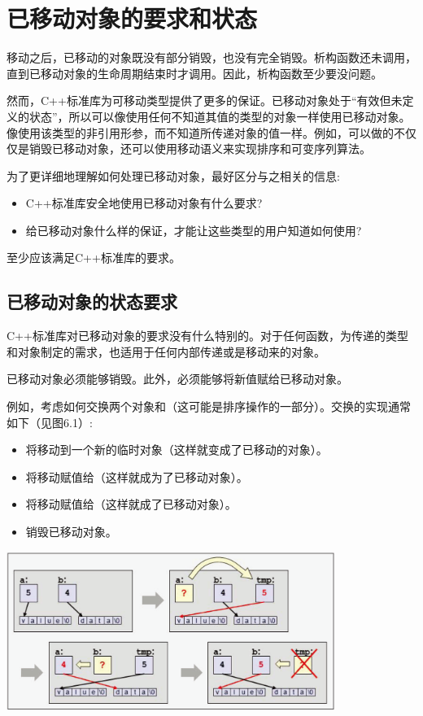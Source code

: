 \section{已移动对象的要求和状态}
移动之后，已移动的对象既没有部分销毁，也没有完全销毁。析构函数还未调用，直到已移动对象的生命周期结束时才调用。因此，析构函数至少要没问题。

然而，C++标准库为可移动类型提供了更多的保证。已移动对象处于“有效但未定义的状态”，所以可以像使用任何不知道其值的类型的对象一样使用已移动对象。像使用该类型的非引用形参，而不知道所传递对象的值一样。例如，可以做的不仅仅是销毁已移动对象，还可以使用移动语义来实现排序和可变序列算法。

为了更详细地理解如何处理已移动对象，最好区分与之相关的信息:

\begin{itemize}
	\item C++标准库安全地使用已移动对象有什么要求?
	\item 给已移动对象什么样的保证，才能让这些类型的用户知道如何使用?
\end{itemize}

至少应该满足C++标准库的要求。

\subsection{已移动对象的状态要求}

C++标准库对已移动对象的要求没有什么特别的。对于任何函数，为传递的类型和对象制定的需求，也适用于任何内部传递或是移动来的对象。

已移动对象必须能够销毁。此外，必须能够将新值赋给已移动对象。

例如，考虑如何交换两个对象和（这可能是排序操作的一部分）。交换的实现通常如下（见图6.1）:

\begin{itemize}
	\item 将移动到一个新的临时对象（这样就变成了已移动的对象）。
	\item 将移动赋值给（这样就成为了已移动对象）。
	\item 将移动赋值给（这样就成了已移动对象）。
	\item 销毁已移动对象。
\end{itemize}

\begin{center}
	\includegraphics[width=0.8\textwidth]{part1/ch6/images/1}
\end{center}

